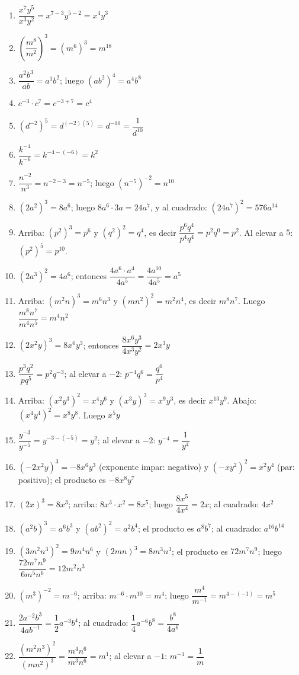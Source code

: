 \documentclass[12pt, letterpaper]{article}
\begin{document}
\begin{enumerate}[leftmargin=*, label=\textbf{\arabic*.}]
  \item $\dfrac{x^7y^5}{x^3y^2} = x^{7-3}y^{5-2} = x^4y^3$
  \item $\left(\dfrac{m^8}{m^2}\right)^3 = \left(m^6\right)^3 = m^{18}$
  \item $\dfrac{a^2b^3}{ab} = a^{1}b^{2}$; luego $\left(ab^2\right)^4 = a^4b^8$
  \item $c^{-3} \cdot c^7 = c^{-3+7} = c^{4}$
  \item $\left(d^{-2}\right)^5 = d^{(-2)(5)} = d^{-10} = \dfrac{1}{d^{10}}$
  \item $\dfrac{k^{-4}}{k^{-6}} = k^{-4-(-6)} = k^{2}$
  \item $\dfrac{n^{-2}}{n^{3}} = n^{-2-3} = n^{-5}$; luego $\left(n^{-5}\right)^{-2} = n^{10}$
  \item $(2a^2)^3 = 8a^6$; luego $8a^6 \cdot 3a = 24a^7$, y al cuadrado: $\left(24a^7\right)^2 = 576a^{14}$
  \item Arriba: $(p^2)^3 = p^6$ y $(q^2)^2 = q^4$, es decir $\dfrac{p^6q^4}{p^4q^4} = p^{2}q^{0} = p^2$. Al elevar a $5$: $\left(p^2\right)^5 = p^{10}$.
  \item $(2a^3)^2 = 4a^6$; entonces $\dfrac{4a^6 \cdot a^4}{4a^5} = \dfrac{4a^{10}}{4a^5} = a^5$
  \item Arriba: $(m^2n)^3 = m^6n^3$ y $(mn^2)^2 = m^2n^4$, es decir $m^8n^7$. Luego $\dfrac{m^8n^7}{m^4n^5} = m^4n^2$
  \item $(2x^2y)^3 = 8x^6y^3$; entonces $\dfrac{8x^6y^3}{4x^3y^2} = 2x^3y$
  \item $\dfrac{p^3q^2}{pq^5} = p^2q^{-3}$; al elevar a $-2$: $p^{-4}q^{6} = \dfrac{q^6}{p^4}$
  \item Arriba: $(x^2y^3)^2 = x^4y^6$ y $(x^3y)^3 = x^9y^3$, es decir $x^{13}y^9$. Abajo: $(x^4y^4)^2 = x^8y^8$. Luego $x^5y$
  \item $\dfrac{y^{-3}}{y^{-5}} = y^{-3-(-5)} = y^2$; al elevar a $-2$: $y^{-4} = \dfrac{1}{y^4}$
  \item $(-2x^2y)^3 = -8x^6y^3$ (exponente impar: negativo) y $(-xy^2)^2 = x^2y^4$ (par: positivo); el producto es $-8x^8y^7$
  \item $(2x)^3 = 8x^3$; arriba: $8x^3 \cdot x^2 = 8x^5$; luego $\dfrac{8x^5}{4x^4} = 2x$; al cuadrado: $4x^2$
  \item $(a^2b)^3 = a^6b^3$ y $(ab^2)^2 = a^2b^4$; el producto es $a^8b^7$; al cuadrado: $a^{16}b^{14}$
  \item $(3m^2n^3)^2 = 9m^4n^6$ y $(2mn)^3 = 8m^3n^3$; el producto es $72m^7n^9$; luego $\dfrac{72m^7n^9}{6m^5n^6} = 12m^2n^3$
  \item $(m^3)^{-2} = m^{-6}$; arriba: $m^{-6} \cdot m^{10} = m^4$; luego $\dfrac{m^4}{m^{-1}} = m^{4-(-1)} = m^5$
  \item $\dfrac{2a^{-2}b^3}{4ab^{-1}} = \dfrac{1}{2}a^{-3}b^4$; al cuadrado: $\dfrac{1}{4}a^{-6}b^8 = \dfrac{b^8}{4a^6}$
  \item $\dfrac{(m^2n^3)^2}{(mn^2)^3} = \dfrac{m^4n^6}{m^3n^6} = m^{1}$; al elevar a $-1$: $m^{-1} = \dfrac{1}{m}$
\end{enumerate}
\end{document}
